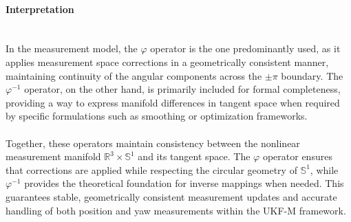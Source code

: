 \paragraph{Interpretation} \mbox{}\\[0.5em] \noindent
In the measurement model, the $\varphi$ operator is the one predominantly used, as it applies measurement space corrections in a geometrically consistent manner, maintaining continuity of the angular components across the $\pm\pi$ boundary. The $\varphi^{-1}$ operator, on the other hand, is primarily included for formal completeness, providing a way to express manifold differences in tangent space when required by specific formulations such as smoothing or optimization frameworks.  
\\ \\
Together, these operators maintain consistency between the nonlinear measurement manifold $\mathbb{R}^3 \times \mathbb{S}^1$ and its tangent space. The $\varphi$ operator ensures that corrections are applied while respecting the circular geometry of $\mathbb{S}^1$, while $\varphi^{-1}$ provides the theoretical foundation for inverse mappings when needed. This guarantees stable, geometrically consistent measurement updates and accurate handling of both position and yaw measurements within the UKF-M framework.




